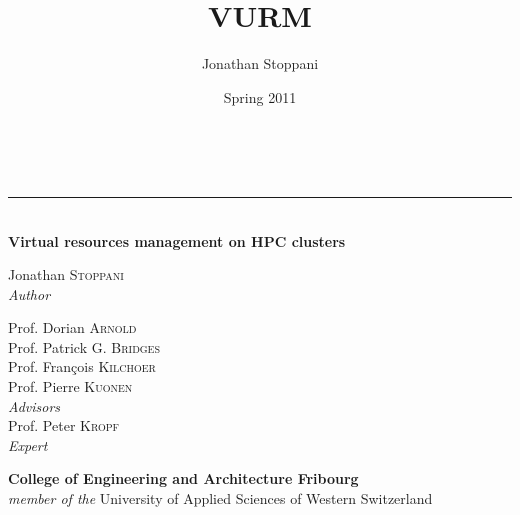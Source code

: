 \title{VURM}
\author{Jonathan Stoppani}
\date{Spring 2011}

\begin{titlepage}

\vspace*{1cm}
\begin{center}

\\[0.3cm]

\rule{\linewidth}{0.75pt}\\[0.3cm]

{\Large \textbf{Virtual resources management on HPC clusters}}

\end{center}

\vspace*{4cm}

\noindent\begin{minipage}[t]{0.5\textwidth}
	\begin{flushleft} \Large
		Jonathan \textsc{Stoppani}\\
		{\small\emph{Author}}
	\end{flushleft}
\end{minipage}
\begin{minipage}[t]{0.5\textwidth}
	\begin{flushright} \Large
		Prof. Dorian \textsc{Arnold}\\[.1cm]
		Prof. Patrick G. \textsc{Bridges}\\[.1cm]
		Prof. François \textsc{Kilchoer}\\[.1cm]
		Prof. Pierre \textsc{Kuonen}\\[.1cm]
		{\small\emph{Advisors}}\\[1cm]
		
		Prof. Peter \textsc{Kropf}\\
		{\small\emph{Expert}}\\[1cm]
	\end{flushright}
\end{minipage}

\vfill


\vfill

\noindent \textbf{College of Engineering and Architecture Fribourg}\\[.1cm]
\textit{member of the} University of Applied Sciences of Western Switzerland


\end{titlepage}
